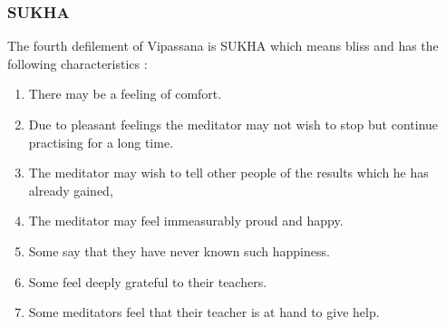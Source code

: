 \documentclass[a5paper,10pt,english]{book}
\begin{document}
\subsubsection{SUKHA}
\label{\detokenize{progress:sukha}}
\sphinxAtStartPar
The fourth defilement of Vipassana is SUKHA which means bliss and has the following characteristics :\sphinxhyphen{}
\begin{enumerate}
%
\item {} 
\sphinxAtStartPar
There may be a feeling of comfort.

\item {} 
\sphinxAtStartPar
Due to pleasant feelings the meditator may not wish to stop but continue practising for a long time.

\item {} 
\sphinxAtStartPar
The meditator may wish to tell other people of the results which he has already gained,

\item {} 
\sphinxAtStartPar
The meditator may feel immeasurably proud and happy.

\item {} 
\sphinxAtStartPar
Some say that they have never known such happiness.

\item {} 
\sphinxAtStartPar
Some feel deeply grateful to their teachers.

\item {} 
\sphinxAtStartPar
Some meditators feel that their teacher is at hand to give help.

\end{enumerate}
\end{document}
